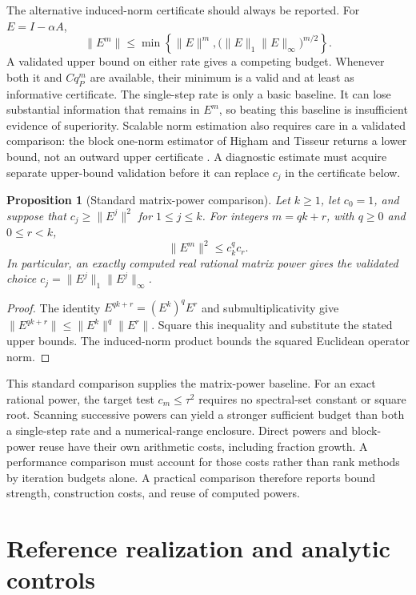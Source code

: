 \documentclass[11pt]{article}
\newcommand{\norm}[1]{\lVert #1\rVert}
\newtheorem{proposition}[theorem]{Proposition}
\theoremstyle{definition}
\theoremstyle{remark}
\numberwithin{equation}{section}
\begin{document}
The alternative induced-norm certificate should always be reported.
For \(E=I-\alpha A\),
\[
 \norm{E^m}\le
 \min\left\{\norm{E}^{m},
 \bigl(\norm{E}_1\norm{E}_\infty\bigr)^{m/2}\right\}.
\]
A validated upper bound on either rate gives a competing budget.
Whenever both it and \(Cq_P^m\) are available, their minimum is a valid
and at least as informative certificate.
The single-step rate is only a basic baseline. It can lose substantial
information that remains in \(E^m\), so beating this baseline is
insufficient evidence of superiority.
Scalable norm estimation also requires care in a validated comparison:
the block one-norm estimator of Higham and Tisseur returns a lower bound,
not an outward upper certificate
\citep[Section~5]{HighamTisseur2000}.
A diagnostic estimate must acquire separate upper-bound validation
before it can replace \(c_j\) in the certificate below.


\begin{proposition}[Standard matrix-power comparison]\label{prop:blocknorm}
Let \(k\ge1\), let \(c_0=1\), and suppose that
\(c_j\ge\norm{E^j}^2\) for \(1\le j\le k\).
For integers \(m=qk+r\), with \(q\ge0\) and \(0\le r<k\),
\[
 \norm{E^m}^2\le c_k^q c_r.
\]
In particular, an exactly computed real rational matrix power gives the
validated choice
\(c_j=\norm{E^j}_1\norm{E^j}_\infty\).
\end{proposition}
\begin{proof}
The identity \(E^{qk+r}=(E^k)^q E^r\) and submultiplicativity give
\(\norm{E^{qk+r}}\le\norm{E^k}^{q}\norm{E^r}\).
Square this inequality and substitute the stated upper bounds.
The induced-norm product bounds the squared Euclidean operator norm.
\end{proof}

This standard comparison supplies the matrix-power baseline.
For an exact rational power, the target test \(c_m\le\tau^2\)
requires no spectral-set constant or square root.
Scanning successive powers can yield a stronger sufficient budget than
both a single-step rate and a numerical-range enclosure.
Direct powers and block-power reuse have their own arithmetic costs,
including fraction growth. A performance comparison must account for
those costs rather than rank methods by iteration budgets alone.
A practical comparison therefore reports bound strength, construction
costs, and reuse of computed powers.

\section{Reference realization and analytic controls}\label{sec:controls}
\end{document}
